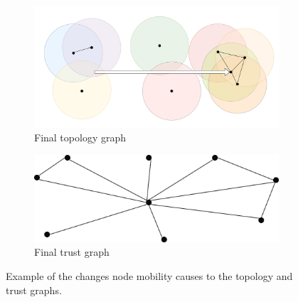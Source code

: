 \begin{figure}
\vspace*{0.5cm} %

\begin{subfigure}{0.4\textwidth}
\includegraphics[width=\linewidth]{images/manet_topology_2.png}
\caption{Final topology graph} \label{fig:2_2c}
\end{subfigure}

\vspace*{0.5cm} %

\begin{subfigure}{0.4\textwidth}
\includegraphics[width=\linewidth]{images/manet_trust_2.png}
\caption{Final trust graph} \label{fig:2_3d}
\end{subfigure}

\caption{Example of the changes node mobility causes to the topology and trust graphs.} \label{fig:manet}
\end{figure}

